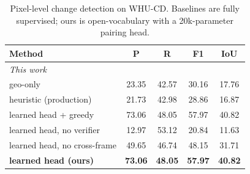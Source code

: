 \begin{table}[t]
\centering
\caption{Pixel-level change detection on WHU-CD. Baselines are fully supervised; ours is open-vocabulary with a 20k-parameter pairing head.}
\label{tab:whu_cd_pixel}
\setlength{\tabcolsep}{4pt}
\begin{tabular}{lcccc}
\toprule
Method & P & R & F1 & IoU \\
\midrule
\midrule
\multicolumn{5}{l}{\emph{This work}} \\
geo-only & 23.35 & 42.57 & 30.16 & 17.76 \\
heuristic (production) & 21.73 & 42.98 & 28.86 & 16.87 \\
learned head + greedy & 73.06 & 48.05 & 57.97 & 40.82 \\
learned head, no verifier & 12.97 & 53.12 & 20.84 & 11.63 \\
learned head, no cross-frame & 49.65 & 46.74 & 48.15 & 31.71 \\
\textbf{learned head (ours)} & \textbf{73.06} & \textbf{48.05} & \textbf{57.97} & \textbf{40.82} \\
\bottomrule
\end{tabular}
\end{table}
